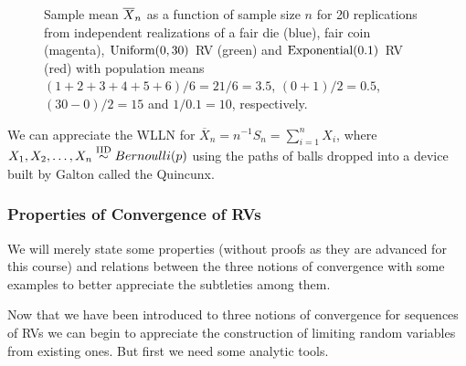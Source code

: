 \begin{prop}
\begin{figure}[htpb]
\caption{Sample mean $\overline{X}_n$ as a function of sample size $n$ for 20 replications from independent realizations of a fair die (blue), fair coin (magenta), $\mbox{{\rm Uniform}}(0,30)$ RV (green) and $\mbox{{\rm Exponential}}(0.1)$ RV (red) with population means $(1+2+3+4+5+6)/6=21/6=3.5$, $(0+1)/2=0.5$, $(30-0)/2=15$ and $1/0.1=10$, respectively.\label{F:RunningMeansFairDieFairCoinUnif01Exp1By10}}
\centering   {}
\end{figure}

\end{prop}
\begin{example}
We can appreciate the WLLN for $\overline{X}_n = n^{-1} S_n = \sum_{i=1}^{n} X_i$, where $X_1,X_2,\ldots,X_n \overset{{\rm IID}}{\sim} Bernoulli(p)$ using the paths of balls dropped into a device built by Galton called the Quincunx.
\end{example}



\subsubsection{Properties of Convergence of RVs}

We will merely state some properties (without proofs as they are advanced for this course) and relations between the three notions of convergence with some examples to better appreciate the subtleties among them.


Now that we have been introduced to three notions of convergence for sequences of RVs we can begin to appreciate the  construction of limiting random variables from existing ones. %
But first we need some analytic tools.

